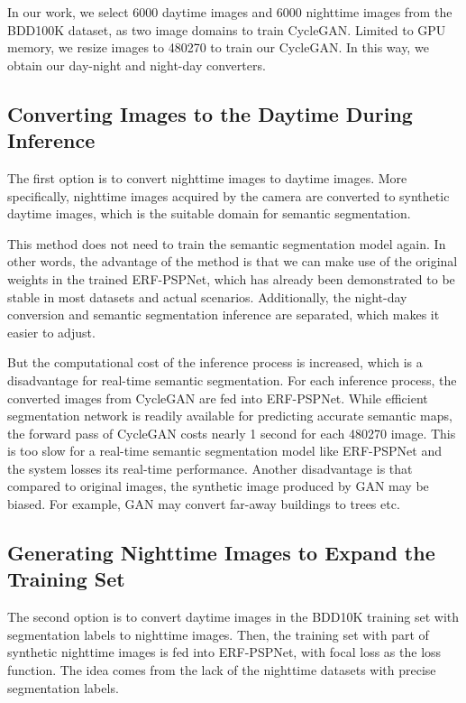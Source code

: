 \documentclass[a4paper]{spie}
\begin{document}
In our work, we select 6000 daytime images and 6000 nighttime images from the BDD100K dataset\cite{yu2018bdd100k}, as two image domains to train CycleGAN. Limited to GPU memory, we resize images to 480270 to train our CycleGAN. In this way, we obtain our day-night and night-day converters.


\subsection{Converting Images to the Daytime During Inference}

The first option is to convert nighttime images to daytime images. More specifically, nighttime images acquired by the camera are converted to synthetic daytime images, which is the suitable domain for semantic segmentation. 

This method does not need to train the semantic segmentation model again. In other words, the advantage of the method is that we can make use of the original weights in the trained ERF-PSPNet, which has already been demonstrated to be stable in most datasets\cite{xiang2019importance} and actual scenarios\cite{yang2019can,yang2019robustifying}. Additionally, the night-day conversion and semantic segmentation inference are separated, which makes it easier to adjust.

But the computational cost of the inference process is increased, which is a disadvantage for real-time semantic segmentation. For each inference process, the converted images from CycleGAN are fed into ERF-PSPNet. While efficient segmentation network is readily available for predicting accurate semantic maps, the forward pass of CycleGAN costs nearly 1 second for each 480270 image. This is too slow for a real-time semantic segmentation model like ERF-PSPNet and the system losses its real-time performance. Another disadvantage is that compared to original images, the synthetic image produced by GAN may be biased. For example, GAN may convert far-away buildings to trees etc.

\subsection{Generating Nighttime Images to Expand the Training Set}

The second option is to convert daytime images in the BDD10K training set with segmentation labels to nighttime images. Then, the training set with part of synthetic nighttime images is fed into ERF-PSPNet, with focal loss as the loss function\cite{lin2017focal,yang2018predicting}. The idea comes from the lack of the nighttime datasets with precise segmentation labels. 
\end{document}
